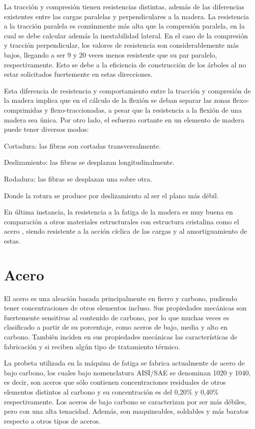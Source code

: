 La tracción y compresión tienen resistencias distintas, además de las diferencias existentes entre las cargas paralelas y perpendiculares a la madera. La resistencia a la tracción paralela es comúnmente más alta que la compresión paralela, en la cual se debe calcular además la inestabilidad lateral. En el caso de la compresión y tracción perpendicular, los valores de resistencia son considerablemente más bajos, llegando a ser 9 y 20 veces menos resistente que su par paralelo, respectivamente. Esto se debe a la eficiencia de construcción de los árboles al no estar solicitados fuertemente en estas direcciones. 

Esta diferencia de resistencia y comportamiento entre la tracción y compresión de la madera implica que en el cálculo de la flexión se deban separar las zonas flexo-comprimidas y flexo-traccionadas, a pesar que la resistencia a la flexión de una madera sea única. Por otro lado, el esfuerzo cortante en un elemento de madera puede tener diversos modos:
\begin{itemize*}
	\item Cortadura: las fibras son cortadas transversalmente.
	\item Deslizamiento: las fibras se desplazan longitudinalmente.
	\item Rodadura: las fibras se desplazan una sobre otra.
\end{itemize*}
Donde la rotura se produce por deslizamiento al ser el plano más débil.

En última instancia, la resistencia a la fatiga de la madera es muy buena en comparación a otros materiales estructurales con estructura cristalina como el acero \cite{sanchez2014guia}, siendo resistente a la acción cíclica de las cargas y al amortiguamiento de estas. 

\section{Acero}
El acero es una aleación basada principalmente en fierro y carbono, pudiendo tener concentraciones de otros elementos incluso. Sus propiedades mecánicas son fuertemente sensitivas al contenido de carbono, por lo que muchas veces es clasificado a partir de su porcentaje, como aceros de bajo, media y alto en carbono. También inciden en sus propiedades mecánicas las características de fabricación y si reciben algún tipo de tratamiento térmico.

La probeta utilizada en la máquina de fatiga se fabrica actualmente de acero de bajo carbono, los cuales bajo nomenclatura AISI/SAE se denominan 1020 y 1040, es decir, son aceros que sólo contienen concentraciones residuales de otros elementos distintos al carbono y su concentración es del 0,20\% y 0,40\% respectivamente. Los aceros de bajo carbono se caracterizan por ser más débiles, pero con una alta tenacidad. Además, son maquineables, soldables y más baratos respecto a otros tipos de aceros.

